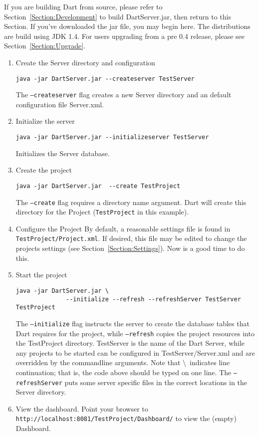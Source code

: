 \documentclass{InsightBook}
\begin{document}
If you are building Dart from source, please refer to
Section~\ref{Section:Development} to build DartServer.jar, then return
to this Section.  If you've downloaded the jar file, you may begin
here.  The distributions are build using JDK 1.4.  For users upgrading
from a pre 0.4 release, please see Section~\ref{Section:Upgrade}.
\begin{enumerate}
    \item Create the Server directory and configuration\\
    \begin{verbatim}
java -jar DartServer.jar --createserver TestServer
    \end{verbatim}
    The \texttt{--createserver} flag creates a new Server directory and an default configuration file Server.xml.
    \item Initialize the server\\
    \begin{verbatim}
java -jar DartServer.jar --initializeserver TestServer
    \end{verbatim}
    Initializes the Server database.
    \item Create the project\\
    \begin{verbatim}
java -jar DartServer.jar  --create TestProject
    \end{verbatim}
    The \texttt{--create} flag requires a directory name argument.
    Dart will create this directory for the Project
    (\texttt{TestProject} in this example).

    \item Configure the Project
    By default, a reasonable settings file is found in
    \texttt{TestProject/Project.xml}.  If desired, this file may be
    edited to change the projects settings (see
    Section~\ref{Section:Settings}).  Now is a good time to do this.

    \item Start the project\\
    \begin{verbatim}
java -jar DartServer.jar \
              --initialize --refresh --refreshServer TestServer TestProject
    \end{verbatim}
    The \texttt{--initialize} flag instructs the server to create the
    database tables that Dart requires for the project, while \texttt{--refresh}
    copies the project resources into the TestProject directory.
    TestServer is the name of the Dart Server, while any projects to
    be started can be configured in TestServer/Server.xml and are
    overridden by the commandline arguments. Note that \textbackslash\
    indicates line continuation; that is, the code above should be
    typed on one line.  The \texttt{--refreshServer} puts some server
    specific files in the correct locations in the Server directory.
    \item View the dashboard.  Point your browser to
          \texttt{http://localhost:8081/TestProject/Dashboard/} to
          view the (empty) Dashboard.
\end{enumerate}
\end{document}
